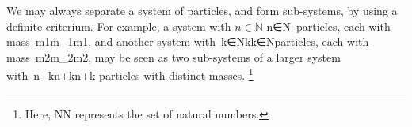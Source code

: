 We may always separate a system of particles, and form sub-systems, by using a definite criterium. For example, a system with $n\in\mathbb{N}$ n∈N​ particles, each with mass m1m_1m1​​, and another system with k∈Nk\in{}k∈N​ particles, each with mass m2m_2m2​​, may be seen as two sub-systems of a larger system with n+kn+kn+k​ particles with distinct masses. \footnote{Here, NN​ represents the set of natural numbers.}